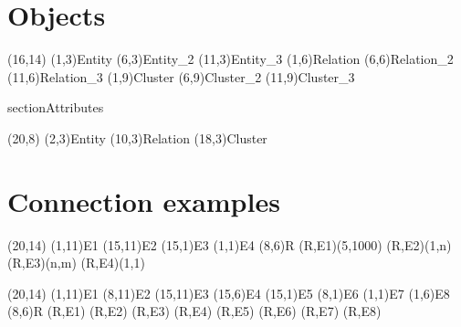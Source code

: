 \documentclass[a4paper,11pt]{article}
\begin{document}
\section{Objects}

\setlength{\unitlength}{.6cm}
\begin{schema}(16,14)
  \entity(1,3){Entity}
  \entity*(6,3){Entity\_2}
  \entity[entity3](11,3){Entity\_3}
  \relation(1,6){Relation}
  \relation*(6,6){Relation\_2}
  \relation[relation3](11,6){Relation\_3}
  \cluster(1,9){Cluster}
  \cluster*(6,9){Cluster\_2}
  \cluster[cluster3](11,9){Cluster\_3}
\end{schema}

section{Attributes}

\begin{schema}(20,8)
  \entity[entity](2,3){Entity}
  \relation[relation](10,3){Relation}
  \cluster[cluster](18,3){Cluster}
\end{schema}

\section{Connection examples}

\begin{schema}(20,14)
  \entity(1,11){E1}
  \entity(15,11){E2}
  \entity(15,1){E3}
  \entity(1,1){E4}
  \relation(8,6){R}
  \connection(R,E1){(5,1000)}
  \connection(R,E2){(1,n)}
  \connection(R,E3){(n,m)}
  \connection(R,E4){(1,1)}
\end{schema}

\begin{schema}(20,14)
  \entity(1,11){E1}
  \entity(8,11){E2}
  \entity(15,11){E3}
  \entity(15,6){E4}
  \entity(15,1){E5}
  \entity(8,1){E6}
  \entity(1,1){E7}
  \entity(1,6){E8}
  \relation(8,6){R}
  \connection(R,E1){}
  \connection(R,E2){}
  \connection(R,E3){}
  \connection(R,E4){}
  \connection(R,E5){}
  \connection(R,E6){}
  \connection(R,E7){}
  \connection(R,E8){}
\end{schema}
\end{document}
